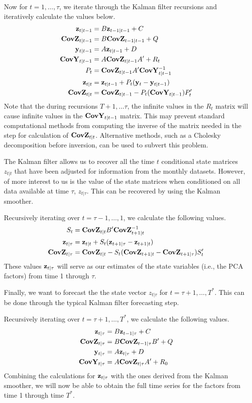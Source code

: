 \documentclass[11pt, letterpaper]{article}\usepackage[]{graphicx}\usepackage[]{color}
\newcommand{\vv}[1]{\textcolor{black}{\mathbf{#1}}}
\begin{document}
Now for $t = 1, \dots, \tau$, we iterate through the Kalman filter recursions and iteratively calculate the values below.
\begin{align*}
	\vv{z}_{t|t-1} &= B \vv{z}_{t-1|t-1} + C\\
	\vv{CovZ}_{t|t-1} &= B \vv{CovZ}_{t-1|t-1} + Q\\
	\vv{y}_{t|t-1} &= A \vv{z}_{t|t-1} + D\\
	\vv{CovY}_{t|t-1} &= A \vv{CovZ}_{t|t-1} A' + R_t\\
	P_t &= \vv{CovZ}_{t|t-1} A' \vv{CovY}^{-1}_{t|t-1}\\
	\vv{z}_{t|t} &= \vv{z}_{t|t-1} + P_t (\vv{y}_t - \vv{y}_{t|t-1})\\
	\vv{CovZ}_{t|t} &= \vv{CovZ}_{t|t-1} - P_t (\vv{CovY}_{t|t-1}) P'_t
\end{align*}
Note that the during recursions $T + 1, \dots \tau$, the infinite values in the $R_t$ matrix will cause infinite values in the $\vv{CovY}_{t|t-1}$ matrix. This may prevent standard computational methods from computing the inverse of the matrix needed in the step for calculation of $\vv{CovZ}_{t|t}$. Alternative methods, such as a Cholesky decomposition before inversion, can be used to subvert this problem.

The Kalman filter allows us to recover all the time $t$ conditional state matrices $z_{t|t}$ that have been adjusted for information from the monthly datasets. However, of more interest to us is the value of the state matrices when conditioned on all data available at time $\tau$, $z_{t|\tau}$. This can be recovered by using the Kalman smoother.

Recursively iterating over $t = \tau - 1, \dots, 1$, we calculate the following values. 
\begin{align*}
	S_{t} &= \vv{CovZ}_{t|t} B' \vv{CovZ}^{-1}_{t + 1|t}\\
	\vv{z}_{t|\tau} &= \vv{z}_{t|t} + S_t (\vv{z}_{t+1|\tau} - \vv{z}_{t + 1|t})\\
	\vv{CovZ}_{t|\tau} &= \vv{CovZ}_{t|t} - S_t(\vv{CovZ}_{t + 1|t} - \vv{CovZ}_{t + 1|\tau})S'_t
\end{align*}
These values $\vv{z}_{t|\tau}$ will serve as our estimates of the state variables (i.e., the PCA factors) from time 1 through $\tau$.

Finally, we want to forecast the the state vector $z_{t|\tau}$ for $t = \tau + 1, \dots, T^*$. This can be done through the typical Kalman filter forecasting step.

Recursively iterating over $t = \tau + 1, \dots, T^*$, we calculate the following values.
\begin{align*}
	\vv{z}_{t|\tau} &= B \vv{z}_{t-1|\tau} + C\\
	\vv{CovZ}_{t|\tau} &= B \vv{CovZ}_{t-1|\tau} B'+ Q\\
	\vv{y}_{t|\tau} &= A \vv{z}_{t|\tau} + D\\
	\vv{CovY}_{t|\tau} &= A \vv{CovZ}_{t|\tau} A' + R_0
\end{align*}
Combining the calculations for $\vv{z}_{t|\tau}$ with the ones derived from the Kalman smoother, we will now be able to obtain the full time series for the factors from time 1 through time $T^*$.
\end{document}
